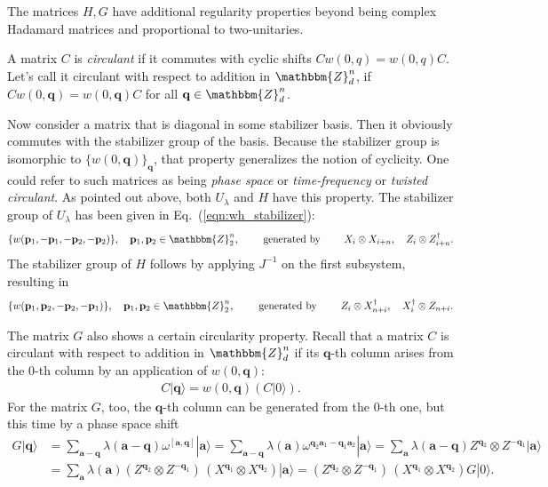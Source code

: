 \documentclass[aps,nofootinbib,floatfix,a4paper]{revtex4}
\newcommand{\1}{\mbox{$\mathbf{1}$}}
\def\ZZ{\mathbbm{Z}}
\renewcommand{\vec}{\mathbf}
\begin{document}
The matrices $H, G$ have additional regularity properties beyond being complex Hadamard matrices and proportional to two-unitaries.

A matrix $C$ is \emph{circulant} if it commutes with cyclic shifts $Cw(0,q)=w(0,q)C$.
Let's call it circulant with respect to addition in $\ZZ_d^n$, if $Cw(0,\vec q)=w(0,\vec q)C$
for all $\vec q\in\ZZ_d^n$.

Now consider a matrix that is diagonal in some stabilizer basis.
Then it obviously commutes with the stabilizer group of the basis.
Because the stabilizer group is isomorphic to  $\{w(0,\vec q)\}_{\vec q}$, that property generalizes the notion of cyclicity.
One could refer to such matrices as being \emph{phase space} or \emph{time-frequency} or \emph{twisted} \emph{circulant}.
As pointed out above, both $U_\lambda$ and $H$ have this property.
The stabilizer group of $U_\lambda$ has been given in Eq.~(\ref{eqn:wh_stabilizer}):
\begin{align}\label{eqn:ulambda_stab}
	\{ w(\vec p_1,-\vec p_1,-\vec p_2,-\vec p_2) \},
	\quad
	\vec p_1, \vec p_2 \in \ZZ_2^n,
	\qquad\text{ generated by }\qquad
	X_i\otimes X_{i+n},
	\quad
	Z_i\otimes Z_{i+n}^\dagger
	.
\end{align}
The stabilizer group of $H$ follows by applying $J^{-1}$ on the first subsystem, resulting in
\begin{align*}
  \{ w(\vec p_1, \vec p_2,-\vec p_2, -\vec p_1) \},
	\quad 
	\vec p_1, \vec p_2\in\ZZ_2^n,
	\qquad\text{ generated by }\qquad
	Z_i \otimes X^\dagger_{n+i},
	\quad
	X^\dagger_{i}\otimes Z_{n+i}.
\end{align*}


The matrix $G$ also shows a certain circularity property.
Recall that a matrix $C$ is circulant with respect to addition in $\ZZ_d^n$ if its $\vec q$-th column arises from the $0$-th column by an application of $w(0,\vec q)$:
\begin{align*}
	C |\vec q\rangle = w(0,\vec q) (C|0\rangle).
\end{align*}
For the matrix $G$, too, the $\vec q$-th column can be generated from the $0$-th one, but this time by a 
phase space shift
\begin{align*}%
	G|\vec q\rangle
	&=
	\sum_{\vec a-\vec q}
	\lambda(\vec a -\vec q) \omega^{[\vec a, \vec q]} |\vec a\rangle
	=
	\sum_{\vec a-\vec q}
	\lambda(\vec a) \omega^{\vec q_2 \vec a_1 - \vec q_1\vec a_2 } |\vec a\rangle
	=
	\sum_{\vec a}
	\lambda(\vec a-\vec q) 
	Z^{\vec q_2}\otimes Z^{-\vec q_1}  |\vec a\rangle \\
	&=
	\sum_{\vec a}
	\lambda(\vec a) 
	(Z^{\vec q_2}\otimes Z^{-\vec q_1})
	\,
	(X^{\vec q_1}\otimes X^{\vec q_2})
	|\vec a\rangle 
	=
	(Z^{\vec q_2}\otimes Z^{-\vec q_1})
	\,
	(X^{\vec q_1}\otimes X^{\vec q_2})
	G|0\rangle 
	.
\end{align*}
\end{document}
